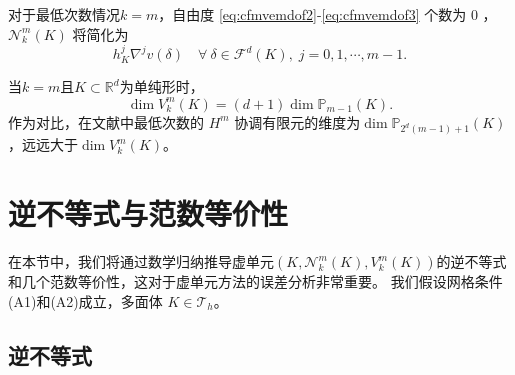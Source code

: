 \begin{remark}\rm
对于最低次数情况$k=m$，自由度 \eqref{eq:cfmvemdof2}-\eqref{eq:cfmvemdof3}
个数为 0
，$\mathcal N_k^m(K)$ 将简化为
$$
h_K^j\nabla^{j}v(\delta) \quad\forall~\delta\in\mathcal F^{d}(K), \;j=0,1,\cdots,m-1.
$$
\end{remark}

\begin{remark}\rm
当$k=m$且$K\subset\mathbb R^d$为单纯形时，
$$
\dim V_k^m(K)=(d+1)\dim\mathbb P_{m-1}(K).
$$
作为对比，在文献\cite{HuLinWu2021,ChenHuang2021Cmgeodecomp}中最低次数的 $H^m$ 
协调有限元的维度为$\dim \mathbb P_{2^d(m-1)+1}(K)$，远远大于$\dim V_k^m(K)$。
\end{remark}

\section{逆不等式与范数等价性}\label{sec:invnorm}

在本节中，我们将通过数学归纳推导虚单元$(K, \mathcal N_k^m(K), V_k^m(K))$的逆不等式和几个范数等价性，这对于虚单元方法的误差分析非常重要。
我们假设网格条件(A1)和(A2)成立，多面体 $K\in\mathcal T_h$。

\subsection{逆不等式}


